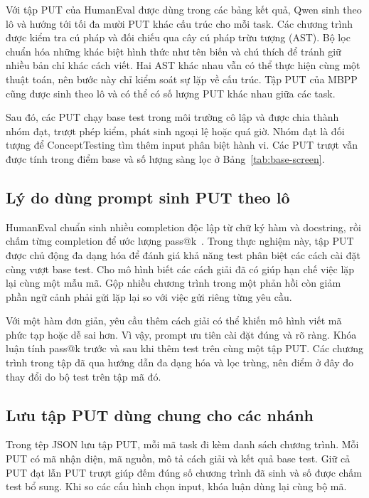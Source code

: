 Với tập PUT của HumanEval được dùng trong các bảng kết quả, Qwen sinh theo lô và hướng tới tối đa mười PUT khác cấu trúc cho mỗi task. Các chương trình được kiểm tra cú pháp và đối chiếu qua cây cú pháp trừu tượng (AST). Bộ lọc chuẩn hóa những khác biệt hình thức như tên biến và chú thích để tránh giữ nhiều bản chỉ khác cách viết. Hai AST khác nhau vẫn có thể thực hiện cùng một thuật toán, nên bước này chỉ kiểm soát sự lặp về cấu trúc. Tập PUT của MBPP cũng được sinh theo lô và có thể có số lượng PUT khác nhau giữa các task.

Sau đó, các PUT chạy base test trong môi trường cô lập và được chia thành nhóm đạt, trượt phép kiểm, phát sinh ngoại lệ hoặc quá giờ. Nhóm đạt là đối tượng để ConceptTesting tìm thêm input phân biệt hành vi. Các PUT trượt vẫn được tính trong điểm base và số lượng sàng lọc ở Bảng~\ref{tab:base-screen}.

\subsection{Lý do dùng prompt sinh PUT theo lô}

HumanEval chuẩn sinh nhiều completion độc lập từ chữ ký hàm và docstring, rồi chấm từng completion để ước lượng pass@k~\cite{chen2021evaluating,openaiHumanEvalScoring}. Trong thực nghiệm này, tập PUT được chủ động đa dạng hóa để đánh giá khả năng test phân biệt các cách cài đặt cùng vượt base test. Cho mô hình biết các cách giải đã có giúp hạn chế việc lặp lại cùng một mẫu mã. Gộp nhiều chương trình trong một phản hồi còn giảm phần ngữ cảnh phải gửi lặp lại so với việc gửi riêng từng yêu cầu.

Với một hàm đơn giản, yêu cầu thêm cách giải có thể khiến mô hình viết mã phức tạp hoặc dễ sai hơn. Vì vậy, prompt ưu tiên cài đặt đúng và rõ ràng. Khóa luận tính pass@k trước và sau khi thêm test trên cùng một tập PUT. Các chương trình trong tập đã qua hướng dẫn đa dạng hóa và lọc trùng, nên điểm ở đây đo thay đổi do bộ test trên tập mã đó.

\subsection{Lưu tập PUT dùng chung cho các nhánh}

Trong tệp JSON lưu tập PUT, mỗi mã task đi kèm danh sách chương trình. Mỗi PUT có mã nhận diện, mã nguồn, mô tả cách giải và kết quả base test. Giữ cả PUT đạt lẫn PUT trượt giúp đếm đúng số chương trình đã sinh và số được chấm test bổ sung. Khi so các cấu hình chọn input, khóa luận dùng lại cùng bộ mã.

